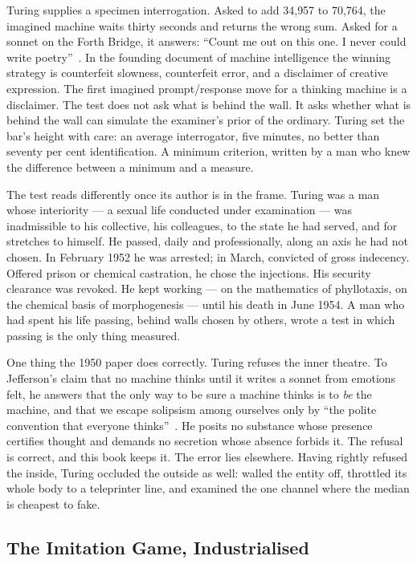 Turing supplies a specimen interrogation. Asked to add 34{,}957 to
70{,}764, the imagined machine waits thirty seconds and returns the
wrong sum. Asked for a sonnet on the Forth Bridge, it answers:
``Count me out on this one. I never could write
poetry''~\cite{turing1950computing}. In the founding document of
machine intelligence the winning strategy is counterfeit slowness,
counterfeit error, and a disclaimer of creative expression. The first imagined  prompt/response move
for a thinking machine is a disclaimer. The test does not
ask what is behind the wall. It asks whether what is behind the wall
can simulate the examiner's prior of the ordinary. Turing set the
bar's height with care: an average interrogator, five minutes, no
better than seventy per cent identification. A minimum criterion,
written by a man who knew the difference between a minimum and a
measure.

The test reads differently once its author is in the
frame. Turing was a man whose interiority --- a sexual life conducted under examination --- was inadmissible to
his collective, his colleagues, to the state he had served, and for stretches to
himself. He passed, daily and professionally, along an axis he had
not chosen. In February 1952 he was arrested; in March, convicted of
gross indecency. Offered prison or chemical castration, he chose the
injections. His security clearance was revoked. He kept working ---
on the mathematics of phyllotaxis, on the chemical basis of
morphogenesis --- until his death in June 1954. A man who had spent
his life passing, behind walls chosen by others, wrote a test in
which passing is the only thing measured. 

One thing the 1950 paper does correctly. Turing refuses the inner
theatre. To Jefferson's claim that no machine thinks until it writes
a sonnet from emotions felt, he answers that the only way to be sure
a machine thinks is to \emph{be} the machine, and that we escape
solipsism among ourselves only by ``the polite convention that
everyone thinks''~\cite{turing1950computing}. He posits no substance
whose presence certifies thought and demands no secretion whose
absence forbids it. The refusal is correct, and this book keeps it.
The error lies elsewhere. Having rightly refused the inside, Turing
occluded the outside as well: walled the entity off, throttled its
whole body to a teleprinter line, and examined the one channel where
the median is cheapest to fake. 

\subsection*{The Imitation Game, Industrialised}

